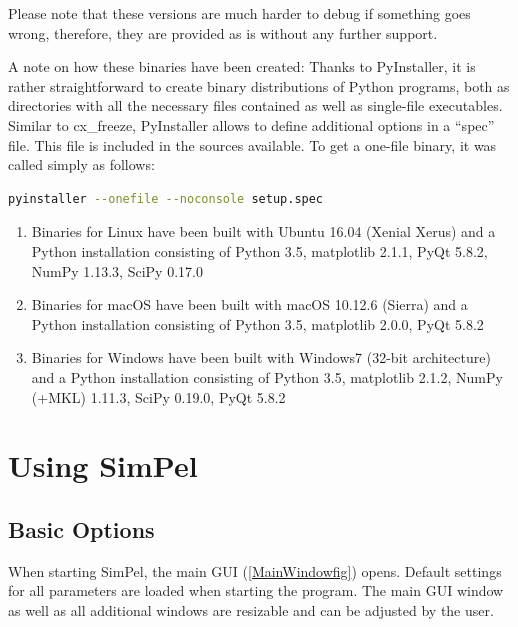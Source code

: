 \documentclass[pdftex,bezier,german,a4,twoside, headexclude,12pt,nochapterprefix, titlepage]{extarticle}
\newcommand{\simpel}{\textsf{SimPel}}
\begin{document}
Please note that these versions are much harder to debug if something goes wrong, therefore, they are provided as is without any further support. 


A note on how these binaries have been created: Thanks to PyInstaller, it is rather straightforward to create binary distributions of Python programs, both as directories with all the necessary files contained as well as single-file executables.  Similar to cx\_freeze, PyInstaller allows to define additional options in a ``spec'' file.  This file is included in the sources available. To get a one-file binary, it was called simply as follows:

\vspace*{1em}

\begin{lstlisting}[language=bash]
  pyinstaller --onefile --noconsole setup.spec
\end{lstlisting}

\begin{enumerate}
\item Binaries for Linux have been built with Ubuntu 16.04 (Xenial Xerus) and a Python installation consisting of Python 3.5, matplotlib 2.1.1, PyQt 5.8.2,  NumPy 1.13.3, SciPy 0.17.0

\item  Binaries for macOS have been built with macOS 10.12.6 (Sierra) and a Python installation consisting of Python 3.5, matplotlib 2.0.0, PyQt 5.8.2

 \item  Binaries for Windows have been built with Windows7 (32-bit architecture) and a Python installation consisting of Python 3.5, matplotlib 2.1.2, NumPy (+MKL) 1.11.3, SciPy 0.19.0, PyQt 5.8.2
\end{enumerate}


\clearpage

\section{Using \simpel}

\subsection{Basic Options}

When starting \simpel, the main GUI (\autoref{MainWindowfig}) opens. Default settings for all parameters are loaded when starting the program. The main GUI window as well as all additional windows are resizable and can be adjusted by the user.
\end{document}
